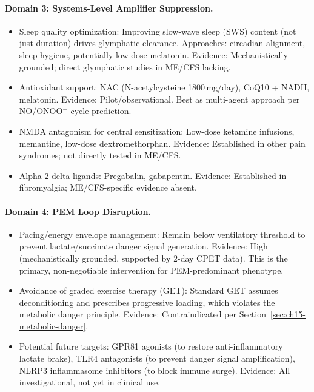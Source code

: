 \paragraph{Domain 3: Systems-Level Amplifier Suppression.}
\begin{itemize}
  \item Sleep quality optimization: Improving slow-wave sleep (SWS) content (not just duration) drives glymphatic clearance. Approaches: circadian alignment, sleep hygiene, potentially low-dose melatonin. Evidence: Mechanistically grounded; direct glymphatic studies in ME/CFS lacking.
  \item Antioxidant support: NAC (N-acetylcysteine 1800\,mg/day), CoQ10 + NADH, melatonin. Evidence: Pilot/observational. Best as multi-agent approach per NO/ONOO$^-$ cycle prediction.
  \item NMDA antagonism for central sensitization: Low-dose ketamine infusions, memantine, low-dose dextromethorphan. Evidence: Established in other pain syndromes; not directly tested in ME/CFS.
  \item Alpha-2-delta ligands: Pregabalin, gabapentin. Evidence: Established in fibromyalgia; ME/CFS-specific evidence absent.
\end{itemize}

\paragraph{Domain 4: PEM Loop Disruption.}
\begin{itemize}
  \item Pacing/energy envelope management: Remain below ventilatory threshold to prevent lactate/succinate danger signal generation. Evidence: High (mechanistically grounded, supported by 2-day CPET data). This is the primary, non-negotiable intervention for PEM-predominant phenotype.
  \item Avoidance of graded exercise therapy (GET): Standard GET assumes deconditioning and prescribes progressive loading, which violates the metabolic danger principle. Evidence: Contraindicated per Section~\ref{sec:ch15-metabolic-danger}.
  \item Potential future targets: GPR81 agonists (to restore anti-inflammatory lactate brake), TLR4 antagonists (to prevent danger signal amplification), NLRP3 inflammasome inhibitors (to block immune surge). Evidence: All investigational, not yet in clinical use.
\end{itemize}

